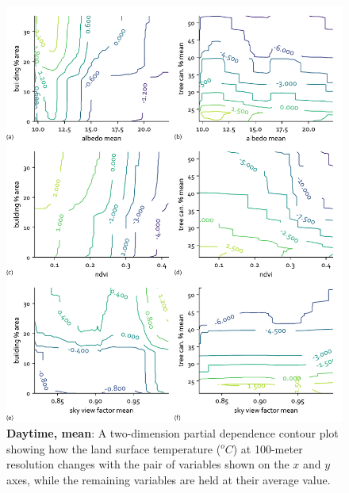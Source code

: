 \documentclass[final,3p,times,onecolumn,sort&compress]{elsarticle}
\begin{document}
\begin{figure}
    \centering
    \includegraphics[width=\linewidth]{fig/report/pdp_2d_day_100.pdf}
    \caption{
    \textbf{Daytime, mean}: A two-dimension partial dependence contour plot showing how the land surface temperature ($^oC$) at 100-meter resolution changes with the pair of variables shown on the $x$ and $y$ axes, while the remaining variables are held at their average value.
    }
    \label{fig:pdp_2dday_100}
\end{figure}
\end{document}
